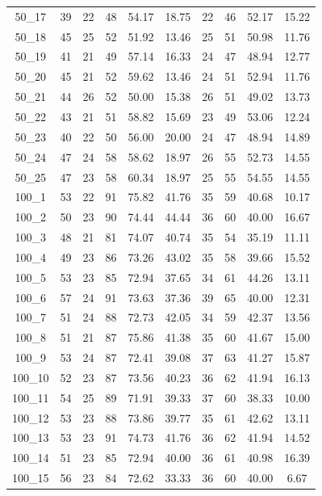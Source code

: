 \documentclass[a4paper,final]{article}
\begin{document}
\begin{longtable}[c]{cccccccccc}
50\_17  & 39  & 22 & 48  & 54.17 & 18.75 & 22  & 46  & 52.17 & 15.22 \\
50\_18  & 45  & 25 & 52  & 51.92 & 13.46 & 25  & 51  & 50.98 & 11.76 \\
50\_19  & 41  & 21 & 49  & 57.14 & 16.33 & 24  & 47  & 48.94 & 12.77 \\
50\_20  & 45  & 21 & 52  & 59.62 & 13.46 & 24  & 51  & 52.94 & 11.76 \\
50\_21  & 44  & 26 & 52  & 50.00 & 15.38 & 26  & 51  & 49.02 & 13.73 \\
50\_22  & 43  & 21 & 51  & 58.82 & 15.69 & 23  & 49  & 53.06 & 12.24 \\
50\_23  & 40  & 22 & 50  & 56.00 & 20.00 & 24  & 47  & 48.94 & 14.89 \\
50\_24  & 47  & 24 & 58  & 58.62 & 18.97 & 26  & 55  & 52.73 & 14.55 \\
50\_25  & 47  & 23 & 58  & 60.34 & 18.97 & 25  & 55  & 54.55 & 14.55 \\
100\_1  & 53  & 22 & 91  & 75.82 & 41.76 & 35  & 59  & 40.68 & 10.17 \\
100\_2  & 50  & 23 & 90  & 74.44 & 44.44 & 36  & 60  & 40.00 & 16.67 \\
100\_3  & 48  & 21 & 81  & 74.07 & 40.74 & 35  & 54  & 35.19 & 11.11 \\
100\_4  & 49  & 23 & 86  & 73.26 & 43.02 & 35  & 58  & 39.66 & 15.52 \\
100\_5  & 53  & 23 & 85  & 72.94 & 37.65 & 34  & 61  & 44.26 & 13.11 \\
100\_6  & 57  & 24 & 91  & 73.63 & 37.36 & 39  & 65  & 40.00 & 12.31 \\
100\_7  & 51  & 24 & 88  & 72.73 & 42.05 & 34  & 59  & 42.37 & 13.56 \\
100\_8  & 51  & 21 & 87  & 75.86 & 41.38 & 35  & 60  & 41.67 & 15.00 \\
100\_9  & 53  & 24 & 87  & 72.41 & 39.08 & 37  & 63  & 41.27 & 15.87 \\
100\_10 & 52  & 23 & 87  & 73.56 & 40.23 & 36  & 62  & 41.94 & 16.13 \\
100\_11 & 54  & 25 & 89  & 71.91 & 39.33 & 37  & 60  & 38.33 & 10.00 \\
100\_12 & 53  & 23 & 88  & 73.86 & 39.77 & 35  & 61  & 42.62 & 13.11 \\
100\_13 & 53  & 23 & 91  & 74.73 & 41.76 & 36  & 62  & 41.94 & 14.52 \\
100\_14 & 51  & 23 & 85  & 72.94 & 40.00 & 36  & 61  & 40.98 & 16.39 \\
100\_15 & 56  & 23 & 84  & 72.62 & 33.33 & 36  & 60  & 40.00 & 6.67  \\

\end{longtable}
\end{document}
